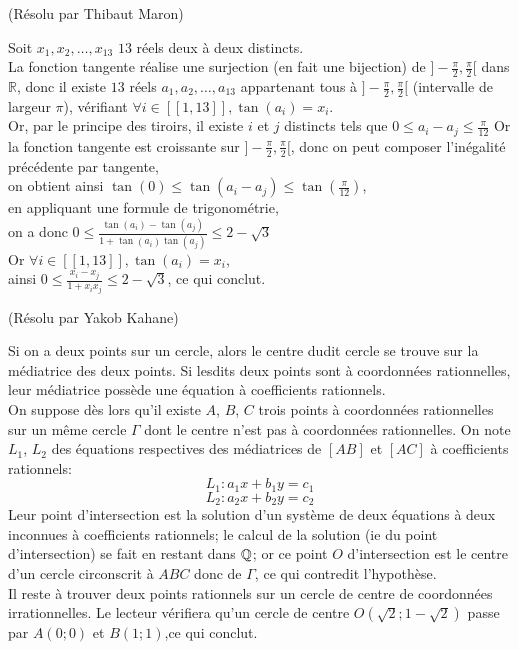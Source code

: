 \begin{sol}[130](Résolu par Thibaut Maron)

Soit $x_1,x_2,\dots,x_{13}$ $13$ r\'eels deux \`a deux distincts.\\
La fonction tangente réalise une surjection (en fait une bijection) de $]-\frac{\pi}{2},\frac{\pi}{2}[$ dans $\mathbb{R}$, donc il existe $13$ réels $a_1,a_2,\dots,a_{13}$ appartenant tous \`a $]-\frac{\pi}{2},\frac{\pi}{2}[$ (intervalle de largeur $\pi$),
vérifiant $\forall i \in [[1,13]], \tan(a_i)=x_i$. \\
Or, par le principe des tiroirs, il existe $i$ et $j$ distincts tels que $ 0 \leq a_i-a_j \leq \frac{\pi}{12}$
Or la fonction tangente est croissante sur $]-\frac{\pi}{2},\frac{\pi}{2}[$, donc on peut composer l'in\'egalit\'e pr\'ec\'edente par tangente, \\
on obtient ainsi $\tan(0) \leq \tan(a_i-a_j) \leq \tan(\frac{\pi}{12})$, \\
en appliquant une formule de trigonométrie, \\
on a donc $0 \leq \frac{\tan(a_i)-\tan(a_j)}{1+\tan(a_i)\tan(a_j)} \leq 2-\sqrt{3} $ \\
Or $\forall i \in [[1,13]], \tan(a_i)=x_i$, \\
ainsi $0 \leq \frac{x_i-x_j}{1+x_i x_j} \leq 2-\sqrt{3}$,
ce qui conclut.
\end{sol}

\begin{sol}[133](Résolu par Yakob Kahane)

		Si on a deux points sur un cercle, alors le centre dudit cercle se trouve sur la m\'ediatrice des deux points. Si lesdits deux points sont \`a coordonn\'ees rationnelles, leur m\'ediatrice poss\`ede une \'equation \`a coefficients rationnels. \\
			On suppose d\`es lors qu'il existe $A$, $B$, $C$ trois points \`a coordonn\'ees rationnelles sur un m\^eme cercle $\Gamma$ dont le centre n'est pas \`a coordonn\'ees rationnelles. On note $L_1$, $L_2$ des \'equations respectives des m\'ediatrices de $[AB]$ et $[AC]$ \`a coefficients rationnels:
			\[L_1: a_1x+b_1y=c_1\]
			\[L_2: a_2x+b_2y=c_2\]
			Leur point d'intersection est la solution d'un syst\`eme de deux \'equations \`a deux inconnues \`a coefficients rationnels; le calcul de la solution (ie du point d'intersection) se fait en restant dans $\mathbb Q$; or ce point $O$ d'intersection est le centre d'un cercle circonscrit \`a $ABC$ donc de $\Gamma$, ce qui contredit l'hypoth\`ese. \\
			Il reste \`a trouver deux points rationnels sur un cercle de centre de coordonn\'ees irrationnelles. Le lecteur v\'erifiera qu'un cercle de centre $O(\sqrt{2};1-\sqrt{2})$ passe par $A(0;0)$ et $B(1;1)$,ce qui conclut.  
\end{sol}


